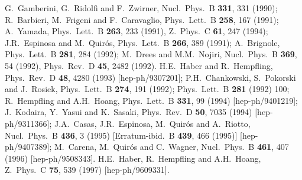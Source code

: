 \documentclass[11pt]{article}
\begin{document}
\begin{thebibliography}{999}
G.~Gamberini, G.~Ridolfi and F.~Zwirner,
  Nucl.\ Phys.\ B {\bf 331}, 331 (1990);
R.~Barbieri, M.~Frigeni and F.~Caravaglio, 
  Phys.\ Lett.\ B {\bf 258}, 167 (1991);
A.~Yamada, 
  Phys.\ Lett.\ B {\bf 263}, 233 (1991),
  Z.\ Phys.\ C {\bf 61}, 247 (1994);
J.R.~Espinosa and M.~Quir\'os, 
  Phys.\ Lett.\ B {\bf 266}, 389 (1991);
A.~Brignole, 
  Phys.\ Lett.\ B {\bf 281}, 284 (1992);
M.~Drees and M.M.~Nojiri, 
  Nucl.\ Phys.\ B {\bf 369}, 54 (1992),
  Phys.\ Rev.\ D {\bf 45}, 2482 (1992).
H.E.~Haber and R.~Hempfling, 
  Phys.\ Rev.\ D {\bf 48}, 4280 (1993)
  [hep-ph/9307201];
P.H.~Chankowski, S.~Pokorski and J.~Rosiek,
  Phys.\ Lett.\ B {\bf 274}, 191 (1992);
  Phys.\ Lett.\ B {\bf 281} (1992) 100;
R.~Hempfling and A.H.~Hoang, 
  Phys.\ Lett.\ B {\bf 331}, 99 (1994)
  [hep-ph/9401219];
J.~Kodaira, Y.~Yasui and K.~Sasaki, 
  Phys.\ Rev.\ D {\bf 50}, 7035 (1994)
  [hep-ph/9311366];
J.A.~Casas, J.R.~Espinosa, M.~Quir\'os and A.~Riotto,
  Nucl.\ Phys.\ B {\bf 436}, 3 (1995)
  [Erratum-ibid.\ B {\bf 439}, 466 (1995)]
  [hep-ph/9407389];
M.~Carena, M.~Quir\'os and C.~Wagner, 
  Nucl.\ Phys.\ B {\bf 461}, 407 (1996)
  [hep-ph/9508343].
H.E.~Haber, R.~Hempfling and A.H.~Hoang,
  Z.\ Phys.\ C {\bf 75}, 539 (1997)
  [hep-ph/9609331].


\end{thebibliography}
\end{document}
